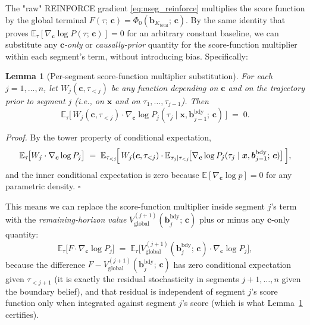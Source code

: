 \documentclass[11pt,a4paper]{article}
\newcommand{\bc}{\bm{c}}
\newcommand{\bx}{\bm{x}}
\newcommand{\bb}{\bm{b}}
\newcommand{\E}{\mathbb{E}}
\newtheorem{lemma}{Lemma}
\begin{document}
The "raw" REINFORCE gradient \eqref{eq:nseg_reinforce} multiplies the score function by
the global terminal $F(\tau;\, \bc) = \Phi_0(\bb_{K_\mathrm{total}};\, \bc)$.  By the same
identity that proves $\E_\tau[\nabla_{\bc} \log P(\tau;\, \bc)] = 0$ for an arbitrary
constant baseline, we can substitute any \emph{$\bc$-only} or \emph{causally-prior}
quantity for the score-function multiplier within each segment's term, without introducing
bias.  Specifically:
\begin{lemma}[Per-segment score-function multiplier substitution]
\label{lem:perseg_substitution}
For each $j = 1, \ldots, n$, let $W_j(\bc, \tau_{<j})$ be any function depending on $\bc$
and on the trajectory \emph{prior} to segment $j$ (i.e., on $\bx$ and on
$\tau_1, \ldots, \tau_{j-1}$).  Then
\begin{equation}
\E_{\tau} \bigl[\,W_j(\bc, \tau_{<j}) \cdot \nabla_{\bc} \log P_j(\tau_j \mid \bx, \bb^{\mathrm{bdy}}_{j-1};\, \bc)\,\bigr] \;=\; 0.
\end{equation}
\end{lemma}

\noindent\emph{Proof.}  By the tower property of conditional expectation,
\[
\E_{\tau}\!\bigl[W_j \cdot \nabla_{\bc} \log P_j\bigr]
\;=\;
\E_{\tau_{<j}}\!\Bigl[\,W_j(\bc, \tau_{<j}) \cdot \E_{\tau_j \mid \tau_{<j}}\!\bigl[\nabla_{\bc} \log P_j(\tau_j \mid \bx, \bb^{\mathrm{bdy}}_{j-1};\, \bc)\bigr]\,\Bigr],
\]
and the inner conditional expectation is zero because $\E[\nabla_{\bc} \log p] = 0$ for any
parametric density.  $\square$

\medskip

This means we can replace the score-function multiplier inside segment $j$'s term with the
\emph{remaining-horizon value} $V_{\mathrm{global}}^{(j+1)}(\bb^{\mathrm{bdy}}_j;\, \bc)$
plus or minus any $\bc$-only quantity:
\begin{equation}
\E_\tau\bigl[F \cdot \nabla_{\bc} \log P_j\bigr]
\;=\;
\E_\tau\bigl[V_{\mathrm{global}}^{(j+1)}(\bb^{\mathrm{bdy}}_j;\, \bc) \cdot \nabla_{\bc} \log P_j\bigr],
\label{eq:perseg_value_substitution}
\end{equation}
because the difference $F - V_{\mathrm{global}}^{(j+1)}(\bb^{\mathrm{bdy}}_j;\, \bc)$ has
zero conditional expectation given $\tau_{<j+1}$ (it is exactly the residual stochasticity
in segments $j+1, \ldots, n$ given the boundary belief), and that residual is independent of
segment $j$'s score function only when integrated against segment $j$'s score (which is what
Lemma~\ref{lem:perseg_substitution} certifies).
\end{document}
